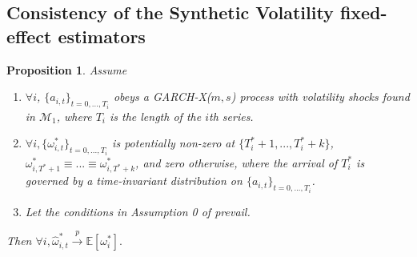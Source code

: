 \documentclass[11pt]{article}
\def\mbf#1{\mathbf{#1}} %
\def\t#1{\tilde{#1}} %
\def\mc#1{\mathcal{#1}} %
\def\E{\mathbb{E}} %
\def\mc#1{\mathcal{#1}}
\newtheorem{prop}{Proposition}
\theoremstyle{definition}
\newenvironment{proof-of-proposition}[1][{}]{\noindent{\bf
    Proof of Proposition {#1}}
  \hspace*{.5em}}{\qed\bigskip\\}
\begin{document}

\subsection{Consistency of the Synthetic Volatility fixed-effect estimators}

\begin{prop}\label{omega_consistency} Assume
\begin{enumerate}
  \item $\forall i$, $\{a_{i,t}\}_{t=0,...,T_i}$ obeys a GARCH-X($m,s$) process with volatility shocks found in $\mc{M}_1$, where $T_i$ is the length of the $i$th series.
  \item $\forall i, \{\omega_{i,t}^{*}\}_{t=0,...,T_i}$ is potentially non-zero at $\{T^{*}_{i}+1,... ,T^{*}_{i}+k\}$, $\omega_{i,T^{*}+1}^{*}\equiv...\equiv\omega_{i,T^{*}+k}^{*}$, and zero otherwise, where the arrival of $T_{i}^{*}$ is governed by a time-invariant distribution on $\{a_{i,t}\}_{t=0,...,T_i}$. \label{stationarity_of_omega_i_t}
  \item Let the conditions in Assumption 0 of \citet{han2014asymptotic} prevail.
\end{enumerate}
Then $\forall i, \hat\omega_{i,t}^{*} \xrightarrow{p} \E[\omega_{i}^{*}].$
\end{prop}
\end{document}

